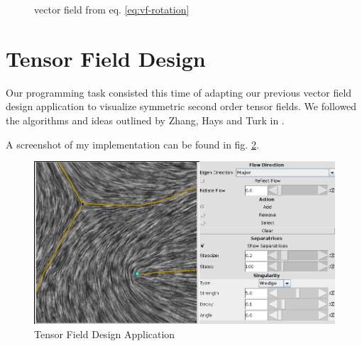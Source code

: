 \documentclass[a4paper,10pt,notitlepage]{scrartcl}
\begin{document}
\begin{figure}
  \centering
  \caption{vector field from eq. \ref{eq:vf-rotation}}
  \label{fig:vf-rotation}
\end{figure}

\section{Tensor Field Design}

Our programming task consisted this time of adapting our previous vector field
design application to visualize symmetric second order tensor fields. We
followed the algorithms and ideas outlined by Zhang, Hays and Turk in
\cite{tfd}.

A screenshot of my implementation can be found in fig. \ref{fig:tfd-app}.

\begin{figure}
 \centering
 \includegraphics[scale=0.5]{img-4-2/app.png}
 \caption{Tensor Field Design Application}
 \label{fig:tfd-app}
\end{figure}
\end{document}
